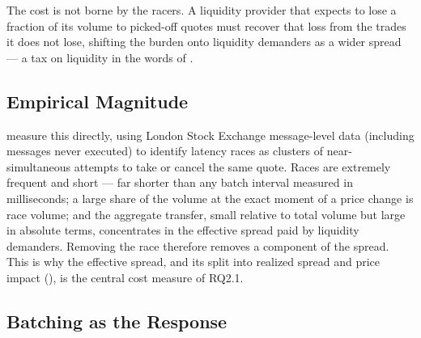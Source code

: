The cost is not borne by the racers. A liquidity provider that expects to
lose a fraction of its volume to picked-off quotes must recover that loss
from the trades it does not lose, shifting the burden onto liquidity
demanders as a wider spread --- a tax on liquidity in the words of
\citet{budish2015hft}.

\subsection{Empirical Magnitude}

\citet{aquilina2022quantifying} measure this directly, using London Stock
Exchange message-level data (including messages never executed) to
identify latency races as clusters of near-simultaneous attempts to take
or cancel the same quote. Races are extremely frequent and short --- far
shorter than any batch interval measured in milliseconds; a large share of
the volume at the exact moment of a price change is race volume; and the
aggregate transfer, small relative to total volume but large in absolute
terms, concentrates in the effective spread paid by liquidity demanders.
Removing the race therefore removes a component of the spread. This is why
the effective spread, and its split into realized spread and price impact
(), is the central cost measure of RQ2.1.

\subsection{Batching as the Response}

